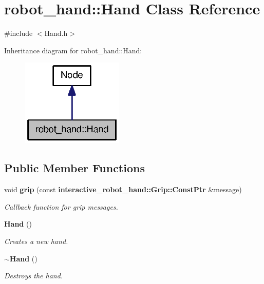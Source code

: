 \section{robot\-\_\-hand\-:\-:Hand Class Reference}
\label{classrobot__hand_1_1Hand}


{\ttfamily \#include $<$Hand.\-h$>$}



Inheritance diagram for robot\-\_\-hand\-:\-:Hand\-:
\nopagebreak
\begin{figure}[H]
\begin{center}
\leavevmode
\includegraphics[width=138pt]{classrobot__hand_1_1Hand__inherit__graph}
\end{center}
\end{figure}
\subsection*{Public Member Functions}
\begin{DoxyCompactItemize}
\item 
void {\bf grip} (const {\bf interactive\-\_\-robot\-\_\-hand\-::\-Grip\-::\-Const\-Ptr} \&message)
\begin{DoxyCompactList}\small\item\em Callback function for grip messages. \end{DoxyCompactList}\item 
{\bf Hand} ()
\begin{DoxyCompactList}\small\item\em Creates a new hand. \end{DoxyCompactList}\item 
{\bf $\sim$\-Hand} ()
\begin{DoxyCompactList}\small\item\em Destroys the hand. \end{DoxyCompactList}\end{DoxyCompactItemize}
